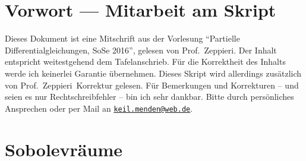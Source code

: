\newcommand{\Semester}{SoSe 2016}
\newcommand{\fach}{Partielle Differentialgleichungen}
\newcommand{\prof}{Prof.\ Zeppieri}






\maketitle
\cleardoubleoddemptypage


\section*{Vorwort --- Mitarbeit am Skript}
Dieses Dokument ist eine Mitschrift aus der Vorlesung \enquote{\fach, \Semester}, gelesen von \prof. 
Der Inhalt entspricht weitestgehend dem Tafelanschrieb. 
Für die Korrektheit des Inhalts werde ich keinerlei Garantie übernehmen. Dieses Skript wird allerdings zusätzlich von \prof \, Korrektur gelesen. 
Für Bemerkungen und Korrekturen -- und seien es nur Rechtschreibfehler -- bin ich sehr dankbar. 
Bitte durch persönliches Ansprechen oder per Mail an \href{mailto:keil.menden@web.de}{\nolinkurl{keil.menden@web.de}}.  

\newpage

\tableofcontents
\cleardoubleoddemptypage
{}
\setcounter{page}{1}





















\newpage
\section{Sobolevräume} 
\label{sec:sobolevraume}

